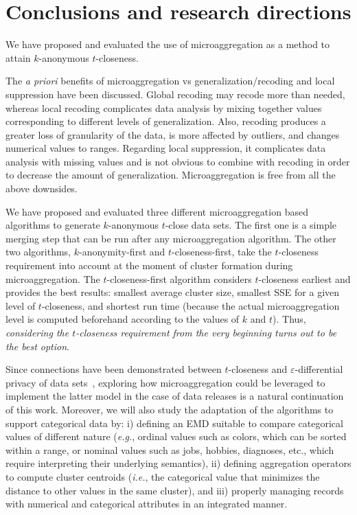 \documentclass[10pt,journal,compsoc]{IEEEtran}
\theoremstyle{definition}
\theoremstyle{plain}
\begin{document}
\section{Conclusions and research directions}
\label{sec:conclusions}
We have proposed and evaluated the use of microaggregation as a 
method to attain $k$-anonymous $t$-closeness. 

The {\em a priori} benefits of microaggregation vs generalization/recoding and 
local suppression 
have been discussed. Global recoding may recode more than needed,
 whereas local recoding complicates data analysis by mixing
together values corresponding to different levels of generalization.
Also, recoding produces a greater loss of 
granularity of the data, is more
affected by outliers, and changes numerical values to ranges.
Regarding local suppression, it complicates data analysis with 
missing values and is not obvious to combine with recoding
in order to decrease the amount of generalization. 
Microaggregation is free from all the above downsides.  

We have proposed and evaluated three different microaggregation
based algorithms to generate $k$-anonymous $t$-close data sets. 
The first one is a simple merging step that can be run after 
any microaggregation algorithm. The other
two algorithms, $k$-anonymity-first and $t$-closeness-first, take
the $t$-closeness requirement into account at the moment of   
cluster formation during microaggregation. 
The $t$-closeness-first algorithm considers $t$-closeness
earliest and provides
the best results: smallest average cluster size, smallest SSE for a given level 
of $t$-closeness, and shortest run time 
(because the actual microaggregation level is computed
beforehand according to the values of $k$ and $t$). 
Thus, {\em considering the
$t$-closeness requirement from the very beginning turns out to be 
the best option}. 

Since connections have been demonstrated between 
$t$-closeness and $\varepsilon$-differential privacy
of data sets~\cite{Soria2013differential,DomingoSoria15}, 
exploring how microaggregation could be leveraged
to implement the latter model in the case of data releases
is a natural continuation of this work. 
Moreover, we will also study the adaptation of the algorithms
to support categorical data by: i) defining an EMD suitable to
compare categorical values of different nature ({\em e.g.}, ordinal values 
such as colors, which can be sorted within a range, 
or nominal values such as jobs, hobbies, diagnoses, etc., 
which require interpreting their underlying semantics), 
ii) defining aggregation operators to compute cluster centroids 
({\em i.e.}, the categorical value that minimizes the distance to 
other values in the same cluster), and iii) properly managing records 
with numerical and categorical attributes in an integrated manner. 
\end{document}
